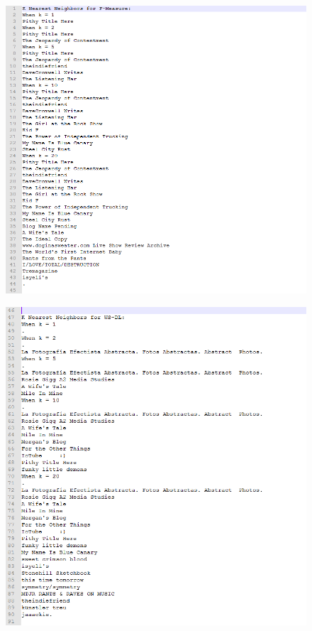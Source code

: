 \documentclass[12pt]{article}
\begin{document}
\begin{figure}[h!]
\centering
\includegraphics[width=6.5in]{KNNfmeasure.png}
\end{figure}
\newpage

\begin{figure}[h!]
\centering
\includegraphics[width=6.5in]{KNNws_dl.png}
\end{figure}
\newpage
\end{document}
